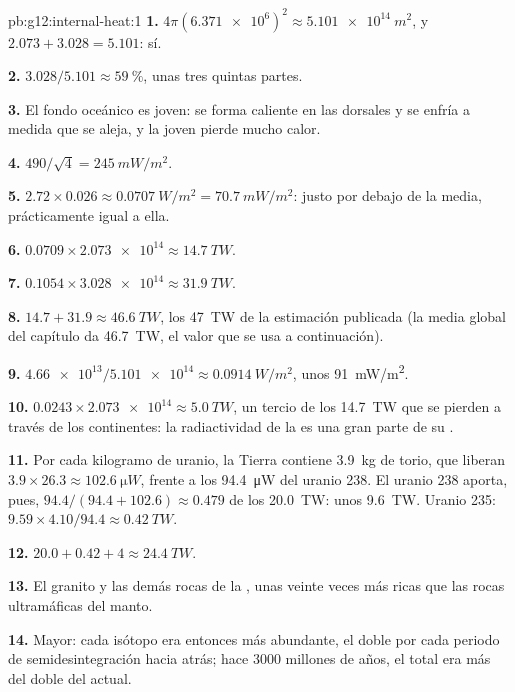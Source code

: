 \begin{solution}{pb:g12:internal-heat:1}
\textbf{1.} $4\pi (\num{6.371e6})^2 \approx \qty{5.101e14}{m^2}$, y
$2.073 + 3.028 = 5.101$: sí.

\textbf{2.} $3.028/5.101 \approx \qty{59}{\percent}$, unas tres quintas partes.

\textbf{3.} El fondo oceánico es joven: se forma caliente en las dorsales y se
enfría a medida que se aleja, y la  joven pierde mucho calor.

\textbf{4.} $490/\sqrt{4} = \qty{245}{mW/m^2}$.

\textbf{5.} $2.72 \times 0.026 \approx \qty{0.0707}{W/m^2} =
\qty{70.7}{mW/m^2}$: justo por debajo de la media, prácticamente igual a ella.

\textbf{6.} $0.0709 \times \num{2.073e14} \approx \qty{14.7}{TW}$.

\textbf{7.} $0.1054 \times \num{3.028e14} \approx \qty{31.9}{TW}$.

\textbf{8.} $14.7 + 31.9 \approx \qty{46.6}{TW}$, los \qty{47}{TW} de la
estimación publicada (la media global del capítulo da \qty{46.7}{TW}, el valor
que se usa a continuación).

\textbf{9.} $\num{4.66e13}/\num{5.101e14} \approx \qty{0.0914}{W/m^2}$,
unos \qty{91}{mW/m^2}.

\textbf{10.} $0.0243 \times \num{2.073e14} \approx \qty{5.0}{TW}$, un tercio de
los \qty{14.7}{TW} que se pierden a través de los continentes: la
radiactividad de la  es una gran parte de su .

\textbf{11.} Por cada kilogramo de uranio, la Tierra contiene \qty{3.9}{kg}
de torio, que liberan $3.9 \times 26.3 \approx \qty{102.6}{\micro W}$, frente
a los \qty{94.4}{\micro W} del uranio 238. El uranio 238 aporta, pues,
$94.4/(94.4 + 102.6) \approx 0.479$ de los \qty{20.0}{TW}: unos
\qty{9.6}{TW}. Uranio 235: $9.59 \times 4.10/94.4 \approx \qty{0.42}{TW}$.

\textbf{12.} $20.0 + 0.42 + 4 \approx \qty{24.4}{TW}$.

\textbf{13.} El granito y las demás rocas de la , unas
veinte veces más ricas que las rocas ultramáficas del manto.

\textbf{14.} Mayor: cada isótopo era entonces más abundante, el doble por cada
periodo de semidesintegración hacia atrás; hace 3000 millones de años, el
total era más del doble del actual.


\end{solution}
